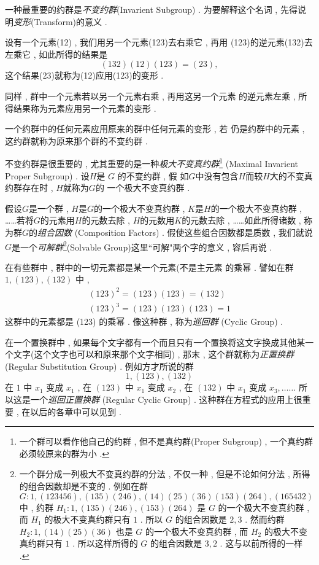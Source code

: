 一种最重要的约群是\emph{不变约群}(Invarient Subgroup) . 为要解释这个名词 , 先得说明\emph{变形}(Transform)的意义 . 

设有一个元素(12) , 我们用另一个元素(123)去右乘它 , 再用 (123)的逆元素(132)去左乘它 , 如此所得的结果是
\[(132)(12)(123) = (23) , \]
这个结果(23)就称为(12)应用(123)的变形 . 

同样 , 群中一个元素若以另一个元素右乘 , 再用这另一个元素 的逆元素左乘 , 所得结果称为元素应用另一个元素的变形 . 

一个约群中的任何元素应用原来的群中任何元素的变形 , 若 仍是约群中的元素 , 这约群就称为原来那个群的不变约群 . 

不变约群是很重要的 , 尤其重要的是一种\emph{极大不变真约群}\footnote{一个群可以看作他自己的约群 , 但不是真约群(Proper Subgroup) ,  一个真约群必须较原来的群为小 . } (Maximal Invarient Proper Subgroup) . 设$H$是 $G$ 的不变约群 , 假 如$G$中没有包含$H$而较$H$大的不变真约群存在时 , $H$就称为$G$的 一个极大不变真约群 . 

假设$G$是一个群 , $H$是$G$的一个极大不变真约群 , $K$是$H$的一个极大不变真约群 , ……若将$G$的元素用$H$的元数去除 , $H$的元数用$K$的元数去除 , ……如此所得诸数 , 称为群$G$的\emph{组合因数} (Composition Factors) . 假使这些组合因数都是质数 , 我们就说 $G$是一个\emph{可解群}\footnote{一个群分成一列极大不变真约群的分法 ,  不仅一种 , 但是不论如何分法 ,  所得 的组合因数却是不变的 . 例如在群
$G:1 , (123456) , (135)(246) , (14)(25)(36)(153)(264) , (165432)$	中 , 约群
$H_{1}: 1 , (135)(246) , (153)(264)$
是 $G$ 的一个极大不变真约群 , 而 $H_{1}$ 的极大不变真约群只有 $1$  . 所以 $G$ 的组合因数是 $2 , 3$ .  然而约群
$H_{2}: 1 , (14)(25)(36)$
也是 $G$ 的一个极大不变真约群 ,  而 $H_{2}$ 的极大不变真约群只有 $1$  . 所以这样所得的 $G$ 的组合因数是 $3 , 2$ . 这与以前所得的一样 . }(Solvable Group)这里“可解"两个字的意义 , 容后再说 . 

在有些群中 , 群中的一切元素都是某一个元素(不是主元素 的乘幂 . 譬如在群
$1 , (123) , (132)$
中 , 
\[
\begin{array}{l}
	(123)^{2}=(123)(123)=(132) \\
	(123)^{3}=(123)(123)(123)=1
\end{array}
\]
这群中的元素都是 (123) 的乘幂 . 像这种群 , 称为\emph{巡回群} (Cyclic Group) . 

在一个置换群中 , 如果每个文字都有一个而且只有一个置换将这文字换成其他某一个文字(这个文字也可以和原来那个文字相同) , 那末 , 这个群就称为\emph{正置换群} (Regular Substitution Group) . 例如方才所说的群
\[
1 , (123) , (132)
\]
在 $1$ 中 $x_{1}$ 变成 $x_{1}$ ,  在 $(123)$ 中 $x_{1}$ 变成 $x_{2}$ ,  在 $(132)$ 中 $x_{1}$ 变成 $x_{3} ,  \ldots \ldots$ 所以这是一个\emph{巡回正置换群} (Regular Cyclic Group) . 这种群在方程式的应用上很重要 , 在以后的各章中可以见到 . 

